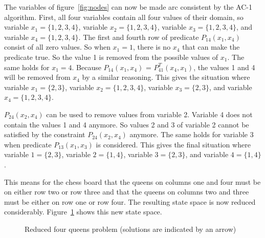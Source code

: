 \documentclass[a4paper,11pt]{article}
\begin{document}
The variables of figure~\ref{fig:nodes} can now be made arc
consistent by the AC-1 algorithm.
First, all four variables contain all four values of their
domain, so variable $x_1 = \{1, 2, 3, 4\}$, variable $x_2 = \{1, 2, 3, 4\}$,
variable $x_3 = \{1, 2, 3, 4\}$, and variable $x_4 = \{1, 2, 3, 4\}$.
The first and fourth row of predicate $P_{14}(x_1, x_4)$ consist of
all zero values. So when $x_1 = 1$, there is no $x_4$ that can make
the predicate true. So the value 1 is removed from the possible values
of $x_1$. The same holds for $x_1 = 4$. Because $P_{14}(x_1, x_4)$ =
$P^T_{41}(x_4, x_1)$, the values 1 and 4 will be removed from $x_4$ by
a similar reasoning. This gives the situation where variable
$x_1 = \{2, 3\}$, variable $x_2 = \{1, 2, 3, 4\}$, variable $x_3 = \{2, 3\}$,
and variable $x_4 = \{1, 2, 3, 4\}$.

$P_{24}(x_2, x_4)$ can be used to remove values from variable 2.
Variable 4 does not contain the values 1 and 4 anymore. So values 2 and 3
of variable 2 cannot be satisfied by the constraint $P_{24}(x_2, x_4)$
anymore. The same holds for variable 3 when predicate $P_{13}(x_1, x_3)$
is considered. This gives the final situation where variable
$1 = \{2, 3\}$, variable $2 = \{1, 4\}$, variable $3 = \{2, 3\}$,
and variable $4 = \{1, 4\}$.

This means for the chess board that the queens on columns
one and four must be on either row two or row three and that the queens
on columns two and three must be either on row one or row four. The 
resulting state space is now reduced considerably.
Figure~\ref{fig:4queen-redstatespace} shows this new state space.

\begin{figure}[htbp]
\begin{center}
\caption{Reduced four queens problem (solutions are indicated by an arrow)}
\label{fig:4queen-redstatespace}
\end{center}
\end{figure}
\end{document}
